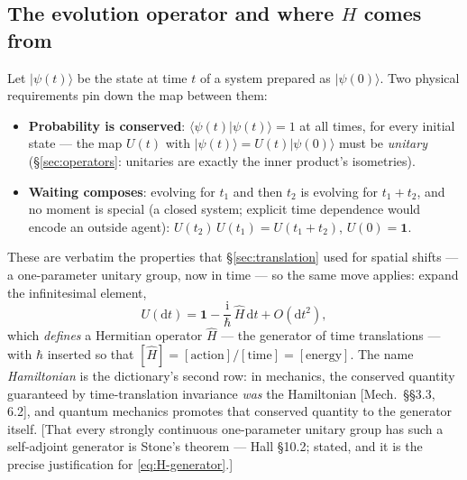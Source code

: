 \documentclass[11pt]{article}
\theoremstyle{plain}
\theoremstyle{definition}
\theoremstyle{remark}
\newcommand{\dd}{\mathrm{d}}
\newcommand{\ii}{\mathrm{i}}
\newcommand{\op}[1]{\hat{#1}}
\newcommand{\idop}{\mathbf{1}}  %
\newcommand{\ket}[1]{\lvert #1 \rangle}
\newcommand{\braket}[2]{\langle #1 | #2 \rangle}
\begin{document}
\subsection{The evolution operator and where $H$ comes from}
\label{sec:evolution-operator}

Let $\ket{\psi(t)}$ be the state at time $t$ of a system prepared as
$\ket{\psi(0)}$. Two physical requirements pin down the map between
them:
\begin{itemize}
  \item \textbf{Probability is conserved}: $\braket{\psi(t)}{\psi(t)}
  = 1$ at all times, for every initial state --- the map
  $U(t)$ with $\ket{\psi(t)} = U(t)\ket{\psi(0)}$ must be
  \emph{unitary} (\S\ref{sec:operators}: unitaries are exactly the
  inner product's isometries).
  \item \textbf{Waiting composes}: evolving for $t_1$ and then $t_2$
  is evolving for $t_1 + t_2$, and no moment is special (a closed
  system; explicit time dependence would encode an outside agent):
  $U(t_2)\,U(t_1) = U(t_1 + t_2)$, $U(0) = \idop$.
\end{itemize}
These are verbatim the properties that \S\ref{sec:translation} used
for spatial shifts --- a one-parameter unitary group, now in time
--- so the same move applies: expand the infinitesimal element,
\begin{equation}
  U(\dd t)
  = \idop - \frac{\ii}{\hbar}\,\op H\,\dd t + O(\dd t^2),
  \label{eq:H-generator}
\end{equation}
which \emph{defines} a Hermitian operator $\op H$ --- the generator
of time translations --- with $\hbar$ inserted so that
$[\op H] = [\text{action}]/[\text{time}] = [\text{energy}]$. The
name \emph{Hamiltonian} is the dictionary's second row: in mechanics,
the conserved quantity guaranteed by time-translation invariance
\emph{was} the Hamiltonian [Mech.\ \S\S3.3, 6.2], and quantum
mechanics
promotes that conserved quantity to the generator itself. [That
every strongly continuous one-parameter unitary group has such a
self-adjoint generator is Stone's theorem --- Hall \S10.2; stated,
and it is the precise justification for \eqref{eq:H-generator}.]
\end{document}
